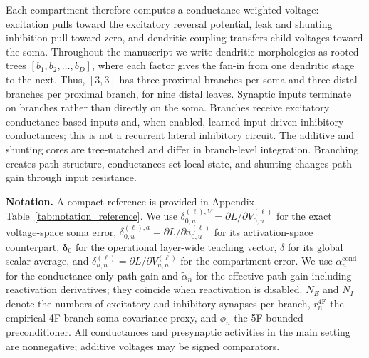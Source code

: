     Each compartment therefore computes a conductance-weighted voltage: excitation pulls toward the excitatory reversal potential, leak and shunting inhibition pull toward zero, and dendritic coupling transfers child voltages toward the soma. Throughout the manuscript we write dendritic morphologies as rooted trees $[b_1,b_2,\dots,b_D]$, where each factor gives the fan-in from one dendritic stage to the next. Thus, $[3,3]$ has three proximal branches per soma and three distal branches per proximal branch, for nine distal leaves. Synaptic inputs terminate on branches rather than directly on the soma. Branches receive excitatory conductance-based inputs and, when enabled, learned input-driven inhibitory conductances; this is not a recurrent lateral inhibitory circuit. The additive and shunting cores are tree-matched and differ in branch-level integration. Branching creates path structure, conductances set local state, and shunting changes path gain through input resistance.

    \noindent\textbf{Notation.} A compact reference is provided in Appendix Table~\ref{tab:notation_reference}. We use $\delta_{0,u}^{(\ell),V}=\partial L/\partial V_{0,u}^{(\ell)}$ for the exact voltage-space soma error, $\delta_{0,u}^{(\ell),a}=\partial L/\partial a_{0,u}^{(\ell)}$ for its activation-space counterpart, $\boldsymbol{\delta}_0$ for the operational layer-wide teaching vector, $\bar{\delta}$ for its global scalar average, and $\delta_{u,n}^{(\ell)}=\partial L/\partial V_{u,n}^{(\ell)}$ for the compartment error. We use $\alpha_n^{\mathrm{cond}}$ for the conductance-only path gain and $\tilde{\alpha}_n$ for the effective path gain including reactivation derivatives; they coincide when reactivation is disabled. $N_E$ and $N_I$ denote the numbers of excitatory and inhibitory synapses per branch, $r_n^{\mathrm{4F}}$ the empirical 4F branch-soma covariance proxy, and $\phi_n$ the 5F bounded preconditioner. All conductances and presynaptic activities in the main setting are nonnegative; additive voltages may be signed comparators.
    
